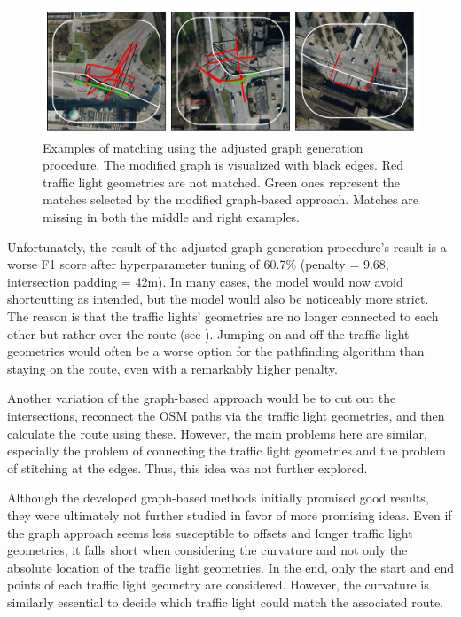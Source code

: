 \begin{figure}[t]
\centering
\includegraphics[width=\linewidth]{images/matching-dijkstra-strict.pdf}
\caption{Examples of matching using the adjusted graph generation procedure. The modified graph is visualized with black edges. Red traffic light geometries are not matched. Green ones represent the matches selected by the modified graph-based approach. Matches are missing in both the middle and right examples.}
\label{fig:sg-selection-graph-strict}
\end{figure}

Unfortunately, the result of the adjusted graph generation procedure's result is a worse F1 score after hyperparameter tuning of 60.7\% (penalty = 9.68, intersection padding = 42m). In many cases, the model would now avoid shortcutting as intended, but the model would also be noticeably more strict. The reason is that the traffic lights' geometries are no longer connected to each other but rather over the route (see ). Jumping on and off the traffic light geometries would often be a worse option for the pathfinding algorithm than staying on the route, even with a remarkably higher penalty. 

Another variation of the graph-based approach would be to cut out the intersections, reconnect the OSM paths via the traffic light geometries, and then calculate the route using these. However, the main problems here are similar, especially the problem of connecting the traffic light geometries and the problem of stitching at the edges. Thus, this idea was not further explored.

Although the developed graph-based methods initially promised good results, they were ultimately not further studied in favor of more promising ideas. Even if the graph approach seems less susceptible to offsets and longer traffic light geometries, it falls short when considering the curvature and not only the absolute location of the traffic light geometries. In the end, only the start and end points of each traffic light geometry are considered. However, the curvature is similarly essential to decide which traffic light could match the associated route.

